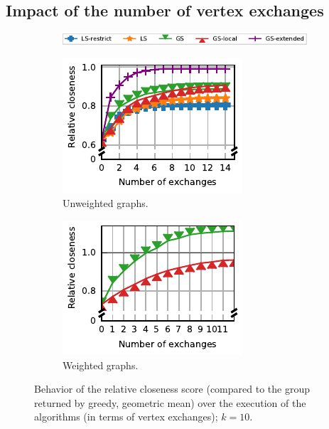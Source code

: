 \subsection{Impact of the number of vertex exchanges}
\label{sec:lsh-vertex-exc-impact}
%
\begin{figure}[tb]
\centering
\begin{subfigure}[t]{\textwidth}
\centering
\includegraphics{./sources/plots/local-search-heu/legend-unweighted.pdf}
\end{subfigure}
\centering
\begin{subfigure}[t]{.5\textwidth}
\centering
\includegraphics{./sources/plots/local-search-heu/impact-num-exchanges-unweighted.pdf}
\caption{Unweighted graphs.}
\label{fig:lsh-gc-num-exchanges-unweighted}
\end{subfigure}\hfill
\begin{subfigure}[t]{.5\textwidth}
\centering
\includegraphics{./sources/plots/local-search-heu/impact-num-exchanges-weighted.pdf}
\caption{Weighted graphs.}
\label{fig:lsh-gc-num-exchanges-weighted}
\end{subfigure}
\caption{Behavior of the relative closeness score
(compared to the group returned by greedy, geometric mean)
over the execution of the algorithms (in terms of vertex exchanges); $k = 10$.}
\label{fig:lsh-gc-num-exchanges}
\end{figure}

